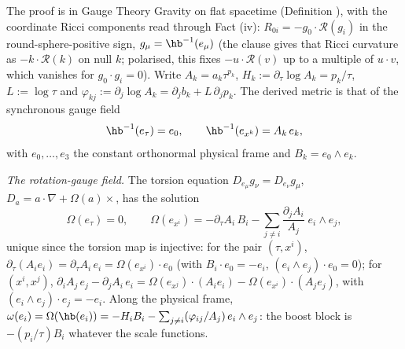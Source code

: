 The proof is in Gauge Theory Gravity on flat spacetime (Definition ), with the coordinate Ricci components read through Fact (iv): $R_{0i} = -g_{0}\cdot\mathcal{R}(g_{i})$ in the round-sphere-positive sign, $g_{\mu} = \hb^{-1}(e_{\mu})$ (the clause gives that Ricci curvature as $-k\cdot\mathcal{R}(k)$ on null $k$; polarised, this fixes $-u\cdot\mathcal{R}(v)$ up to a multiple of $u\cdot v$, which vanishes for $g_{0}\cdot g_{i} = 0$). Write $A_{k} = a_{k}\tau^{p_{k}}$, $H_{k} := \partial_{\tau}\log A_{k} = p_{k}/\tau$, $L := \log\tau$ and $\varphi_{kj} := \partial_{j}\log A_{k} = \partial_{j}b_{k} + L\,\partial_{j}p_{k}$. The derived metric is that of the synchronous gauge field
\[
\hb^{-1}(e_{\tau}) = e_{0}, \qquad \hb^{-1}(e_{x^{k}}) = A_{k}\,e_{k},
\]
with $e_{0}, \dots, e_{3}$ the constant orthonormal physical frame and $B_{k} = e_{0}\wedge e_{k}$.

\emph{The rotation-gauge field.} The torsion equation $D_{e_\mu}g_{\nu} = D_{e_\nu}g_{\mu}$, $D_{a} = a\cdot\nabla + \Omega(a)\times$, has the solution
\[
\Omega(e_{\tau}) = 0, \qquad \Omega(e_{x^{i}}) = -\partial_{\tau}A_{i}\,B_{i} - \sum_{j \neq i}\frac{\partial_{j}A_{i}}{A_{j}}\;e_{i}\wedge e_{j},
\]
unique since the torsion map is injective: for the pair $(\tau, x^{i})$, $\partial_{\tau}(A_{i}e_{i}) = \partial_{\tau}A_{i}\,e_{i} = \Omega(e_{x^{i}})\cdot e_{0}$ (with $B_{i}\cdot e_{0} = -e_{i}$, $(e_{i}\wedge e_{j})\cdot e_{0} = 0$); for $(x^{i}, x^{j})$, $\partial_{i}A_{j}\,e_{j} - \partial_{j}A_{i}\,e_{i} = \Omega(e_{x^{j}})\cdot(A_{i}e_{i}) - \Omega(e_{x^{i}})\cdot(A_{j}e_{j})$, with $(e_{i}\wedge e_{j})\cdot e_{j} = -e_{i}$. Along the physical frame, $\omega(e_{i}) = \Omega(\hb(e_{i})) = -H_{i}B_{i} - \sum_{j \neq i}(\varphi_{ij}/A_{j})\,e_{i}\wedge e_{j}$: the boost block is $-(p_{i}/\tau)B_{i}$ whatever the scale functions.

